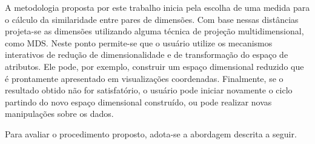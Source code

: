 A metodologia proposta por este trabalho inicia pela escolha de uma medida para o cálculo da similaridade entre pares de dimensões. Com base nessas distâncias projeta-se as dimensões utilizando alguma técnica de projeção multidimensional, como MDS. Neste ponto permite-se que o usuário utilize os mecanismos interativos de redução de dimensionalidade e de transformação do espaço de atributos. Ele pode, por exemplo, construir um espaço dimensional reduzido que é prontamente apresentado em visualizações coordenadas. Finalmente, se o resultado obtido não for satisfatório, o usuário pode iniciar novamente o ciclo partindo do novo espaço dimensional construído, ou pode realizar novas manipulações sobre os dados.

Para avaliar o procedimento proposto, adota-se a abordagem descrita a seguir.








